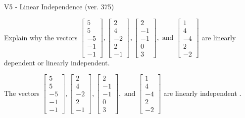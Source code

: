 \begin{exercise}
  \begin{exerciseTitle}V5 - Linear Independence (ver. 375)\end{exerciseTitle}
  \begin{exerciseStatement}
    Explain why the vectors \(\left[\begin{array}{r}
5 \\
5 \\
-5 \\
-1 \\
-1
\end{array}\right] , \left[\begin{array}{r}
2 \\
4 \\
-2 \\
2 \\
-1
\end{array}\right] , \left[\begin{array}{r}
2 \\
-1 \\
-1 \\
0 \\
3
\end{array}\right] , \text{ and } \left[\begin{array}{r}
1 \\
4 \\
-4 \\
2 \\
-2
\end{array}\right]\) are linearly dependent or linearly independent.	


  \end{exerciseStatement}
  \begin{exerciseAnswer}
   The vectors \(\left[\begin{array}{r}
5 \\
5 \\
-5 \\
-1 \\
-1
\end{array}\right] , \left[\begin{array}{r}
2 \\
4 \\
-2 \\
2 \\
-1
\end{array}\right] , \left[\begin{array}{r}
2 \\
-1 \\
-1 \\
0 \\
3
\end{array}\right] , \text{ and } \left[\begin{array}{r}
1 \\
4 \\
-4 \\
2 \\
-2
\end{array}\right]\) are 
  	 linearly independent  .
  


  \end{exerciseAnswer}
\end{exercise}